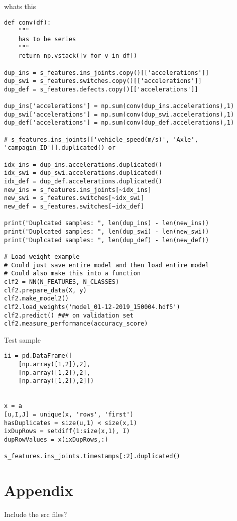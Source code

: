 whats this
\begin{verbatim}
def conv(df):
    """
    has to be series
    """
    return np.vstack([v for v in df])

dup_ins = s_features.ins_joints.copy()[['accelerations']]
dup_swi = s_features.switches.copy()[['accelerations']]
dup_def = s_features.defects.copy()[['accelerations']]

dup_ins['accelerations'] = np.sum(conv(dup_ins.accelerations),1)
dup_swi['accelerations'] = np.sum(conv(dup_swi.accelerations),1)
dup_def['accelerations'] = np.sum(conv(dup_def.accelerations),1)

# s_features.ins_joints[['vehicle_speed(m/s)', 'Axle', 'campagin_ID']].duplicated() or

idx_ins = dup_ins.accelerations.duplicated()
idx_swi = dup_swi.accelerations.duplicated()
idx_def = dup_def.accelerations.duplicated()
new_ins = s_features.ins_joints[~idx_ins]
new_swi = s_features.switches[~idx_swi]
new_def = s_features.switches[~idx_def]

print("Duplcated samples: ", len(dup_ins) - len(new_ins))
print("Duplcated samples: ", len(dup_swi) - len(new_swi))
print("Duplcated samples: ", len(dup_def) - len(new_def))

# Load weight example 
# Could just save entire model and then load entire model
# Could also make this into a function
clf2 = NN(N_FEATURES, N_CLASSES)
clf2.prepare_data(X, y)
clf2.make_model2()
clf2.load_weights('model_01-12-2019_150004.hdf5')
clf2.predict() ### on validation set
clf2.measure_performance(accuracy_score)
\end{verbatim}

Test sample
\begin{verbatim}
ii = pd.DataFrame([
    [np.array([1,2]),2], 
    [np.array([1,2]),2], 
    [np.array([1,2]),2]])
    
    
x = a
[u,I,J] = unique(x, 'rows', 'first')
hasDuplicates = size(u,1) < size(x,1)
ixDupRows = setdiff(1:size(x,1), I)
dupRowValues = x(ixDupRows,:)

s_features.ins_joints.timestamps[:2].duplicated()
\end{verbatim}


\newpage
\cleardoublepage
\appendix
\chapter{Appendix}
\label{newgrammar}
Include the src files?


